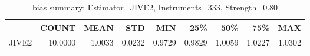 \begin{table}[ht]
\centering
\caption{bias summary: Estimator=JIVE2, Instruments=333, Strength=0.80}
\begin{tabular}{lrrrrrrrr}
\toprule
 & COUNT & MEAN & STD & MIN & 25\% & 50\% & 75\% & MAX \\
\midrule
JIVE2 & 10.0000 & 1.0033 & 0.0232 & 0.9729 & 0.9829 & 1.0059 & 1.0227 & 1.0302 \\
\bottomrule
\end{tabular}
\end{table}
